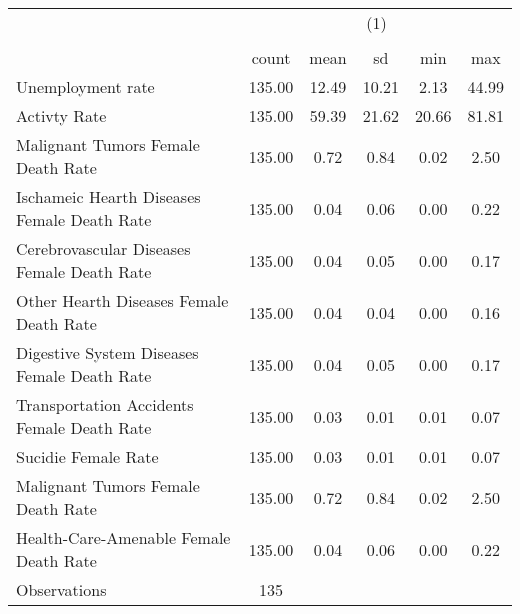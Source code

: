 {
\def\sym#1{\ifmmode^{#1}\else\(^{#1}\)\fi}
\begin{tabular}{l*{1}{ccccc}}
\hline\hline
                    &\multicolumn{5}{c}{(1)}                                                  \\
                    &\multicolumn{5}{c}{}                                                     \\
                    &       count         &        mean&          sd&         min&         max\\
\hline
Unemployment rate   &      135.00         &       12.49&       10.21&        2.13&       44.99\\
Activty Rate        &      135.00         &       59.39&       21.62&       20.66&       81.81\\
Malignant Tumors Female Death Rate&      135.00         &        0.72&        0.84&        0.02&        2.50\\
Ischameic Hearth Diseases Female Death Rate&      135.00         &        0.04&        0.06&        0.00&        0.22\\
Cerebrovascular Diseases Female Death Rate&      135.00         &        0.04&        0.05&        0.00&        0.17\\
Other Hearth Diseases Female Death Rate&      135.00         &        0.04&        0.04&        0.00&        0.16\\
Digestive System Diseases Female Death Rate&      135.00         &        0.04&        0.05&        0.00&        0.17\\
Transportation Accidents Female Death Rate&      135.00         &        0.03&        0.01&        0.01&        0.07\\
Sucidie Female Rate &      135.00         &        0.03&        0.01&        0.01&        0.07\\
Malignant Tumors Female Death Rate&      135.00         &        0.72&        0.84&        0.02&        2.50\\
Health-Care-Amenable Female Death Rate&      135.00         &        0.04&        0.06&        0.00&        0.22\\
\hline
Observations        &         135         &            &            &            &            \\
\hline\hline
\end{tabular}
}
